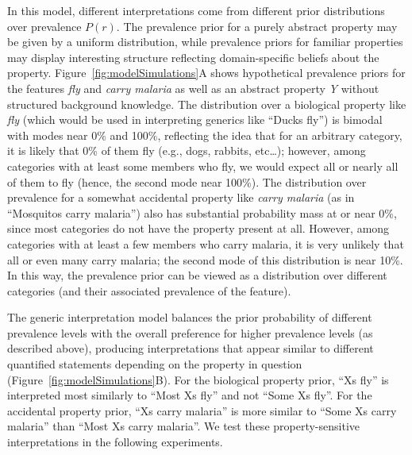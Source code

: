\documentclass[floatsintext,doc]{apa6}
\theoremstyle{definition}
\theoremstyle{definition}
\theoremstyle{definition}
\theoremstyle{remark}
\begin{document}
In this model, different interpretations come from different prior
distributions over prevalence \(P(r)\). The prevalence prior for a
purely abstract property may be given by a uniform distribution, while
prevalence priors for familiar properties may display interesting
structure reflecting domain-specific beliefs about the property.
Figure~\ref{fig:modelSimulations}A shows hypothetical prevalence priors
for the features \emph{fly} and \emph{carry malaria} as well as an
abstract property \emph{Y} without structured background knowledge. The
distribution over a biological property like \emph{fly} (which would
be used in interpreting generics like \enquote{Ducks fly}) is bimodal
with modes near 0\% and 100\%, reflecting the idea that for an arbitrary
category, it is likely that 0\% of them fly (e.g., dogs, rabbits,
etc\ldots{}); however, among categories with at least some members who
fly, we would expect all or nearly all of them to fly (hence, the second
mode near 100\%). The distribution over prevalence for a somewhat
accidental property like \emph{carry malaria} (as in \enquote{Mosquitos
carry malaria}) also has substantial probability mass at or near 0\%,
since most categories do not have the property present at all. However,
among categories with at least a few members who carry malaria, it is
very unlikely that all or even many carry malaria; the second mode of
this distribution is near 10\%. In this way, the prevalence prior can be
viewed as a distribution over different categories (and their associated
prevalence of the feature).

The generic interpretation model balances the prior probability of
different prevalence levels with the overall preference for higher
prevalence levels (as described above), producing interpretations that
appear similar to different quantified statements depending on the
property in question (Figure~\ref{fig:modelSimulations}B). For the biological
property prior, \enquote{Xs fly} is interpreted most similarly to
\enquote{Most Xs fly} and not \enquote{Some Xs fly}. For the accidental
property prior, \enquote{Xs carry malaria} is more similar to
\enquote{Some Xs carry malaria} than \enquote{Most Xs carry malaria}. We
test these property-sensitive interpretations in the following
experiments.

\end{document}
